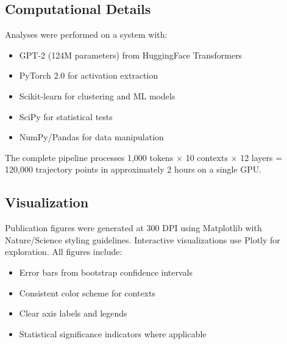\subsection{Computational Details}

Analyses were performed on a system with:
\begin{itemize}
\item GPT-2 (124M parameters) from HuggingFace Transformers
\item PyTorch 2.0 for activation extraction
\item Scikit-learn for clustering and ML models
\item SciPy for statistical tests
\item NumPy/Pandas for data manipulation
\end{itemize}

The complete pipeline processes 1,000 tokens × 10 contexts × 12 layers = 120,000 trajectory points in approximately 2 hours on a single GPU.

\subsection{Visualization}

Publication figures were generated at 300 DPI using Matplotlib with Nature/Science styling guidelines. Interactive visualizations use Plotly for exploration. All figures include:
\begin{itemize}
\item Error bars from bootstrap confidence intervals
\item Consistent color scheme for contexts
\item Clear axis labels and legends
\item Statistical significance indicators where applicable
\end{itemize}